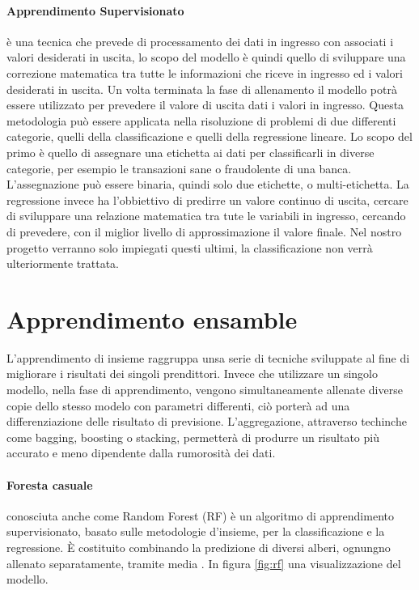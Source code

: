 \documentclass[%
    corpo=12pt,
    twoside,
    oldstyle,
    autoretitolo,
    greek,
    evenboxes,
]{toptesi}
\begin{document}
\paragraph{Apprendimento Supervisionato}
è una tecnica che prevede di processamento dei dati in ingresso con associati i valori desiderati in uscita, lo scopo del modello è quindi quello di sviluppare una correzione matematica tra tutte le informazioni che riceve in ingresso ed i valori desiderati in uscita. Un volta terminata la fase di allenamento il modello potrà essere utilizzato per prevedere il valore di uscita dati i valori in ingresso. Questa metodologia può essere applicata nella risoluzione di problemi di due differenti categorie, quelli della classificazione e quelli della regressione lineare. Lo scopo del primo è quello di assegnare una etichetta ai dati per classificarli in diverse categorie, per esempio le transazioni sane o fraudolente di una banca. L'assegnazione può essere binaria, quindi solo due etichette, o multi-etichetta. La regressione invece ha l'obbiettivo di predirre un valore continuo di uscita, cercare di sviluppare una relazione matematica tra tute le variabili in ingresso, cercando di prevedere, con il miglior livello di approssimazione il valore finale. Nel nostro progetto verranno solo impiegati questi ultimi, la classificazione non verrà ulteriormente trattata.

\section{Apprendimento ensamble}
L'apprendimento di insieme raggruppa unsa serie di tecniche sviluppate al fine di migliorare i risultati dei singoli prendittori. Invece che utilizzare un singolo modello, nella fase di apprendimento, vengono simultaneamente allenate diverse copie dello stesso modelo con parametri differenti, ciò porterà ad una differenziazione delle risultato di previsione. L'aggregazione, attraverso techinche come bagging, boosting o stacking, permetterà di produrre un risultato più accurato e meno dipendente dalla rumorosità dei dati.

\paragraph{Foresta casuale}
conosciuta anche come Random Forest (RF) è un algoritmo di apprendimento supervisionato, basato sulle metodologie d'insieme, per la classificazione e la regressione. È costituito combinando la predizione di diversi alberi, ognungno allenato separatamente, tramite media \cite{RF_theory}. In figura \ref{fig:rf} una visualizzazione del modello.
\end{document}

